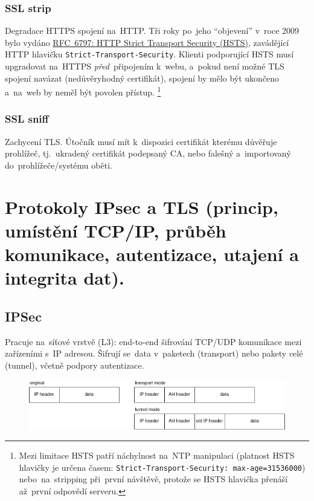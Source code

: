 \subsubsection{SSL strip}

Degradace HTTPS spojení na~HTTP. Tři roky po~jeho \enquote{objevení} v~roce 2009 bylo vydáno \href{https://datatracker.ietf.org/doc/html/rfc6797}{RFC~6797: HTTP Strict Transport Security (HSTS)}, zavádějící HTTP hlavičku \texttt{Strict-Transport-Security}. Klienti podporující HSTS musí upgradovat na~HTTPS \emph{před}~připojením k~webu, a~pokud není možné TLS spojení navázat (nedůvěryhodný certifikát), spojení by mělo být ukončeno a~na~web by neměl být povolen přístup.%
\footnote{Mezi limitace HSTS patří náchylnost na~NTP manipulaci (platnost HSTS hlavičky je určena časem: \texttt{Strict-Transport-Security: max-age=31536000}) nebo~na~stripping při~první návštěvě, protože se HSTS hlavička přenáší až~první odpovědí serveru.}

\subsubsection{SSL sniff}

Zachycení TLS. Útočník musí mít k~dispozici certifikát kterému důvěřuje prohlížeč, tj.~ukradený certifikát podepsaný CA, nebo falešný a~importovaný do~prohlížeče/systému oběti.

\clearpage
\section{Protokoly IPsec a TLS (princip, umístění TCP/IP, průběh komunikace, autentizace, utajení a integrita dat).}

\subsection{IPSec}

Pracuje na~síťové vrstvě (L3): end-to-end šifrování TCP/UDP komunikace mezi zařízeními s~IP adresou. Šifrují se~data v~paketech (transport) nebo pakety celé (tunnel), včetně podpory autentizace.

\begin{figure}[ht]
    \centering
    \includegraphics[width=\textwidth]{images/ipsec}
\end{figure}

